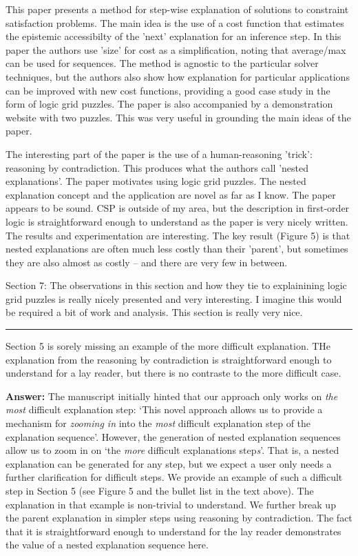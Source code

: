 \documentclass{article}
\newcommand\comment[1]{\marginpar{\tiny #1}}
\renewcommand\comment[1]{#1}
\newcommand{\answer}[1]{{\comment{\textbf{Answer:} #1}}}
\begin{document}
\begin{quoteit}
	This paper presents a method for step-wise explanation of solutions to
	constraint satisfaction problems. The main idea is the use of a cost
	function that estimates the epistemic accessibilty of the 'next'
	explanation for an inference step. In this paper the authors use 'size'
	for cost as a simplification, noting that average/max can be used for
	sequences.  The method is agnostic to the particular solver techniques,
	but the authors also show how explanation for particular applications
	can be improved with new cost functions, providing a good case study in
	the form of logic grid puzzles. The paper is also accompanied by a
	demonstration website with two puzzles. This was very useful in
	grounding the main ideas of the paper.
	
	The interesting part of the paper is the use of a human-reasoning
	'trick': reasoning by contradiction. This produces what the authors
	call 'nested explanations'. The paper motivates using logic grid
	puzzles. The nested explanation concept and the application are novel
	as far as I know. The paper appears to be sound. CSP is outside of my
	area, but the description in first-order logic is straightforward
	enough to understand as the paper is very nicely written. The results
	and experimentation are interesting. The key result (Figure 5) is that
	nested explanations are often much less costly than their 'parent', but
	sometimes they are also almost as costly -- and there are very few in
	between.
	
	
	Section 7: The observations in this section and how they tie to
	explainining logic grid puzzles is really nicely presented and very
	interesting. I imagine this would be required a bit of work and
	analysis. This section is really very nice.
	
	\rule{0.9\textwidth}{0.4pt}
	
Section 5 is sorely missing an example of the more difficult explanation. THe explanation from the reasoning by contradiction is straightforward enough to understand for a lay reader, but there is no contraste to the more difficult case.
\end{quoteit}

\answer{The manuscript initially hinted that our approach only works on \textit{the most} difficult explanation step: `This novel approach allows us to provide a mechanism for \emph{zooming in} into the \emph{most} difficult explanation step of the explanation sequence'. 
However, the generation of nested explanation sequences allow us to zoom in on `the \textit{more} difficult explanations step\textit{s}'. 
That is, a nested explanation can be generated for any step, but we expect a user only needs a further clarification for difficult steps. We provide an example of such a difficult step in Section 5 (see Figure 5 and the bullet list in the text above).
	The explanation in that example is non-trivial to understand. We further break up the parent explanation in simpler steps using reasoning by contradiction. The fact that it is straightforward enough to understand for the lay reader demonstrates the value of a nested explanation sequence here.}
\end{document}
